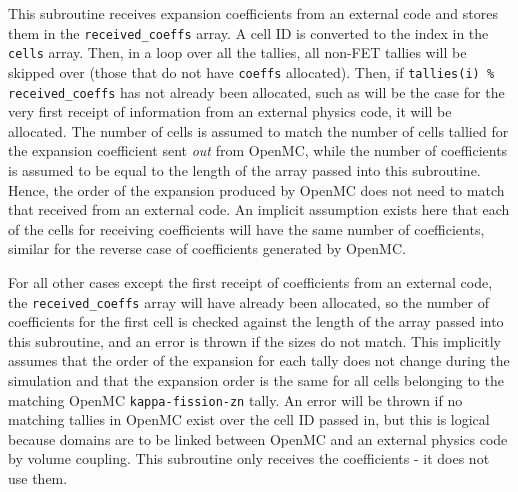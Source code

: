 \documentclass[10pt]{article}
\newcounter{subsubsubsection}[subsubsection]
\numberwithin{equation}{section} %
\begin{document}
This subroutine receives expansion coefficients from an external code and stores them in the {\tt received\_coeffs} array. A cell ID is converted to the index in the {\tt cells} array. Then, in a loop over all the tallies, all non-FET tallies will be skipped over (those that do not have {\tt coeffs} allocated). Then, if {\tt tallies(i) \% received\_coeffs} has not already been allocated, such as will be the case for the very first receipt of information from an external physics code, it will be allocated. The number of cells is assumed to match the number of cells tallied for the expansion coefficient sent {\it out} from OpenMC, while the number of coefficients is assumed to be equal to the length of the array passed into this subroutine. Hence, the order of the expansion produced by OpenMC does not need to match that received from an external code. An implicit assumption exists here that each of the cells for receiving coefficients will have the same number of coefficients, similar for the reverse case of coefficients generated by OpenMC. 

For all other cases except the first receipt of coefficients from an external code, the {\tt received\_coeffs} array will have already been allocated, so the number of coefficients for the first cell is checked against the length of the array passed into this subroutine, and an error is thrown if the sizes do not match. This implicitly assumes that the order of the expansion for each tally does not change during the simulation and that the expansion order is the same for all cells belonging to the matching OpenMC {\tt kappa-fission-zn} tally. An error will be thrown if no matching tallies in OpenMC exist over the cell ID passed in, but this is logical because domains are to be linked between OpenMC and an external physics code by volume coupling. This subroutine only receives the coefficients - it does not use them.
\end{document}

